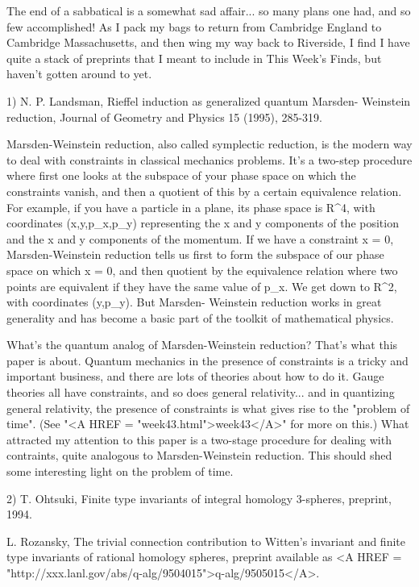

The end of a sabbatical is a somewhat sad affair... so many plans
one had, and so few accomplished!  As I pack my bags to return from 
Cambridge England to Cambridge Massachusetts, and then
wing my way back to Riverside, I find I have quite a stack of preprints 
that I meant to include in This Week's Finds, but haven't gotten around 
to yet.  

1) N. P. Landsman, Rieffel induction as generalized quantum Marsden-
Weinstein reduction, Journal of Geometry and Physics 15 (1995), 285-319.

Marsden-Weinstein reduction, also called symplectic reduction,
is the modern way to deal with constraints in classical mechanics
problems.  It's a two-step procedure where first one looks at the
subspace of your phase space on which the constraints vanish, and
then a quotient of this by a certain equivalence relation.  For example,
if you have a particle in a plane, its phase space is R^4, with coordinates
(x,y,p_x,p_y) representing the x and y components of the position and
the x and y components of the momentum.  If we have a constraint
x = 0, Marsden-Weinstein reduction tells us first to form the subspace
of our phase space on which x = 0, and then quotient by the equivalence
relation where two points are equivalent if they have the same value of
p_x.  We get down to R^2, with coordinates (y,p_y).  But Marsden-
Weinstein reduction works in great generality and has become a basic
part of the toolkit of mathematical physics.  

What's the quantum analog of Marsden-Weinstein reduction?  That's
what this paper is about.  Quantum mechanics in the presence of
constraints is a tricky and important business, and there are lots of theories
about how to do it.   Gauge theories all have constraints, and so does
general relativity... and in quantizing general relativity, the presence of
constraints is what gives rise to the "problem of time".  (See "<A HREF = "week43.html">week43</A>"
for more on this.)  What attracted my attention to this paper is a two-stage 
procedure for dealing with contraints, quite analogous to Marsden-Weinstein 
reduction.  This should shed some interesting light on the problem of time.


2) T. Ohtsuki, Finite type invariants of integral homology 3-spheres, preprint,
1994.

L. Rozansky, The trivial connection contribution to Witten's invariant
and finite type invariants of rational homology spheres, preprint
available as
<A HREF = "http://xxx.lanl.gov/abs/q-alg/9504015">q-alg/9505015</A>.

